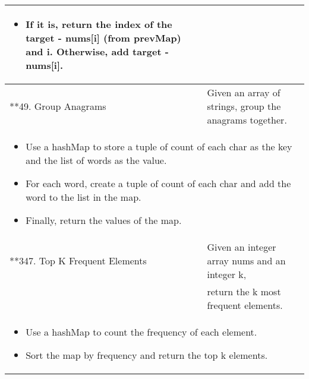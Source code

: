 \begin{summary}
\begin{center}
\begin{tabular}{ll}
{\begin{itemize}
\begin{itemize}
                        \item If it is, return the index of the target - nums[i] (from prevMap) and i. Otherwise, add target - nums[i].
                    \end{itemize}
                \end{itemize}
            } \\
            \midrule
            **49. Group Anagrams & Given an array of strings, group the anagrams together. \\
            \multicolumn{2}{p{\linewidth}}{
                \begin{itemize}
                    \item Use a hashMap to store a tuple of count of each char as the key and the list of words as the value.
                    \item For each word, create a tuple of count of each char and add the word to the list in the map.
                    \item Finally, return the values of the map.
                \end{itemize}
            } \\
            \midrule
            **347. Top K Frequent Elements & Given an integer array nums and an integer k, \\
            & return the k most frequent elements. \\
            \multicolumn{2}{p{\linewidth}}{
                \begin{itemize}
                    \item Use a hashMap to count the frequency of each element.
                    \item Sort the map by frequency and return the top k elements.
                \end{itemize}
            } \\
            \bottomrule
        \end{tabular}
    \end{center}
\end{summary}